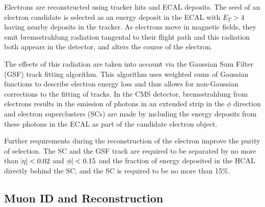  Electrons are reconstructed using tracker
  hits and ECAL deposits.
 The seed of an electron candidate is selected as 
  an energy deposit in the ECAL with $E_T > 4$ \GeV
  having nearby deposits in the tracker.
 As electrons move in magnetic fields,
  they emit bremsstrahlung radiation
  tangental to their flight path
  and this radiation both appears in the detector, 
  and alters the course of the electron.

 The effects of this radiation are taken
  into account via the Gaussian Sum Filter (GSF)
  track fitting algorithm.
 This algorithm uses weighted sums of Gaussian
  functions to describe electron energy loss
  and thus allows for non-Gaussian corrections
  to the fitting of tracks.
 In the CMS detector, 
  bremsstrahlung from electrons results in the
  emission of photons in an extended strip
  in the $\phi$ direction and electron
  superclusters (SCs) are made by 
  including the energy deposits from 
  these photons in the ECAL as part of the
  candidate electron object.

 Further requirements during the reconstruction of
  the electron improve the purity of selection.
 The SC and the GSF track are required to 
  be separated by no more than $\abs{\eta}<0.02$
  and $\abs{\phi}<0.15$ and the fraction of
  energy deposited in the HCAL directly behind
  the SC, and the SC is required to be no more
  than 15\%.
 
\subsection{Muon ID and Reconstruction}

